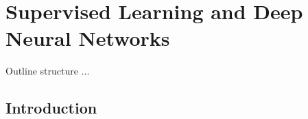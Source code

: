 \chapter{Supervised Learning and Deep Neural Networks}
\label{ch:supervised_learning}

\begin{remark}{Outline}
structure ...
\end{remark}

\section{Introduction}

